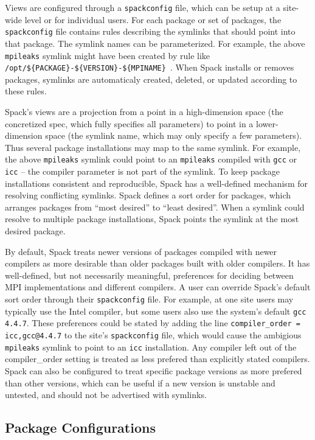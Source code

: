 Views are configured through a {\tt spackconfig} file, which can be setup at a site-wide level or for individual users.  For each package or set of packages, the {\tt spackconfig} file contains rules describing the symlinks that should point into that package.  The symlink names can be parameterized.  For example, the above {\tt mpileaks} symlink might have been created by rule like {\tt /opt/\$\{PACKAGE\}-\$\{VERSION\}-\$\{MPINAME\} }.  When Spack installs or removes packages, symlinks are automaticaly created, deleted, or updated according to these rules.  

Spack's views are a projection from a point in a high-dimension space (the concretized spec, which fully specifies all parameters) to point in a lower-dimension space (the symlink name, which may only specify a few parameters).  Thus several package installations may map to the same symlink.  For example, the above {\tt mpileaks} symlink could point to an {\tt mpileaks} compiled with {\tt gcc} or {\tt icc} -- the compiler parameter is not part of the symlink.  To keep  package installations  consistent and reproducible, Spack has a well-defined mechanism for resolving conflicting symlinks.  Spack defines a sort order for packages, which arranges packages from ``most desired'' to ``least desired''.  When a symlink could resolve to multiple package installations, Spack points the symlink at the most desired package.  

By default, Spack treats newer versions of packages compiled with newer compilers as more desirable than older packages built with older compilers.  It has well-defined, but not necessarily meaningful, preferences for deciding between MPI implementations and different compilers.  A user can override Spack's default sort order through their {\tt spackconfig} file.  For example, at one site users may typically use the Intel compiler, but some users also use the system's default {\tt gcc 4.4.7}.  These preferences could be stated by adding the line {\tt compiler\_order = icc,gcc@4.4.7} to the site's {\tt spackconfig} file, which would cause the ambigious {\tt mpileaks} symlink to point to an {\tt icc} installation.  Any compiler left out of the compiler\_order setting is treated as less prefered than explicitly stated compilers.  Spack can also be configured to treat specific package versions as more prefered than other versions, which can be useful if a new version is unstable and untested, and should not be advertised with symlinks.  


\subsection{Package Configurations}

